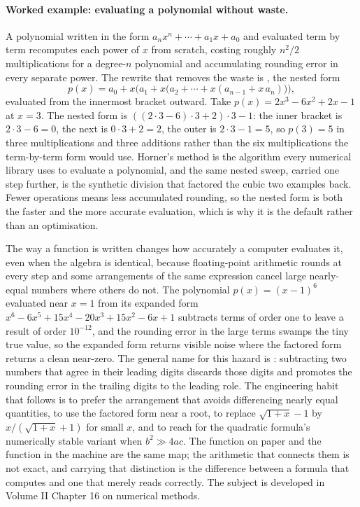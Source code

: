 \paragraph{Worked example: evaluating a polynomial without waste.}
A polynomial written in the form $a_n x^n + \cdots + a_1 x + a_0$ and
evaluated term by term recomputes each power of $x$ from scratch,
costing roughly $n^2/2$ multiplications for a degree-$n$ polynomial and
accumulating rounding error in every separate power. The rewrite that
removes the waste is , the nested form
\[
  p(x) = a_0 + x\bigl(a_1 + x\bigl(a_2 + \cdots + x(a_{n-1} +
    x\,a_n)\bigr)\bigr),
\]
evaluated from the innermost bracket outward. Take
$p(x) = 2x^3 - 6x^2 + 2x - 1$ at $x = 3$. The nested form is
$((2 \cdot 3 - 6) \cdot 3 + 2) \cdot 3 - 1$: the inner bracket is
$2 \cdot 3 - 6 = 0$, the next is $0 \cdot 3 + 2 = 2$, the outer is
$2 \cdot 3 - 1 = 5$, so $p(3) = 5$ in three multiplications and three
additions rather than the six multiplications the term-by-term form
would use. Horner's method is the algorithm every numerical library
uses to evaluate a polynomial, and the same nested sweep, carried one
step further, is the synthetic division that factored the cubic two
examples back. Fewer operations means less accumulated rounding, so
the nested form is both the faster and the more accurate evaluation,
which is why it is the default rather than an optimisation.

\begin{mastery}
The way a function is written changes how accurately a computer
evaluates it, even when the algebra is identical, because floating-point
arithmetic rounds at every step and some arrangements of the same
expression cancel large nearly-equal numbers where others do not. The
polynomial $p(x) = (x - 1)^6$ evaluated near $x = 1$ from its expanded
form $x^6 - 6x^5 + 15x^4 - 20x^3 + 15x^2 - 6x + 1$ subtracts terms of
order one to leave a result of order $10^{-12}$, and the rounding error
in the large terms swamps the tiny true value, so the expanded form
returns visible noise where the factored form returns a clean near-zero.
The general name for this hazard is : subtracting two numbers that agree in their leading
digits discards those digits and promotes the rounding error in the
trailing digits to the leading role. The engineering habit that follows
is to prefer the arrangement that avoids differencing nearly equal
quantities, to use the factored form near a root, to replace
$\sqrt{1 + x} - 1$ by $x/(\sqrt{1 + x} + 1)$ for small $x$, and to
reach for the quadratic formula's numerically stable variant when
$b^2 \gg 4ac$. The function on paper and the function in the machine
are the same map; the arithmetic that connects them is not exact, and
carrying that distinction is the difference between a formula that
computes and one that merely reads correctly. The subject is developed
in Volume II Chapter 16 on numerical methods.
\end{mastery}

